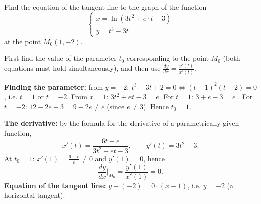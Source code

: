 
\begin{question}
Find the equation of the tangent line to the graph of the function-
\[ \begin{cases} x=\ln\left(3t^2+e\cdot t-3\right)\\ y=t^3-3t\end{cases} \]
at the point $M_0(1,-2)$.
\end{question}

\begin{hint}
First find the value of the parameter $t_0$ corresponding to the point $M_0$ (both equations must hold simultaneously), and then use $\frac{dy}{dx}=\frac{y'(t)}{x'(t)}$.
\end{hint}

\begin{solution}
\textbf{Finding the parameter:} from $y=-2$: $t^3-3t+2=0\iff(t-1)^2(t+2)=0$, i.e. $t=1$ or $t=-2$.
From $x=1$: $3t^2+et-3=e$. For $t=1$: $3+e-3=e$ \checkmark. For $t=-2$: $12-2e-3=9-2e\neq e$ (since $e\neq3$). Hence $t_0=1$.

\textbf{The derivative:} by the formula for the derivative of a parametrically given function,
\[ x'(t)=\frac{6t+e}{3t^2+et-3},\qquad y'(t)=3t^2-3. \]
At $t_0=1$: $x'(1)=\frac{6+e}{e}\neq 0$ and $y'(1)=0$, hence
\[ \frac{dy}{dx}\Big|_{M_0}=\frac{y'(1)}{x'(1)}=0. \]
\textbf{Equation of the tangent line:} $y-(-2)=0\cdot(x-1)$, i.e. $\boxed{y=-2}$ (a horizontal tangent).
\end{solution}
